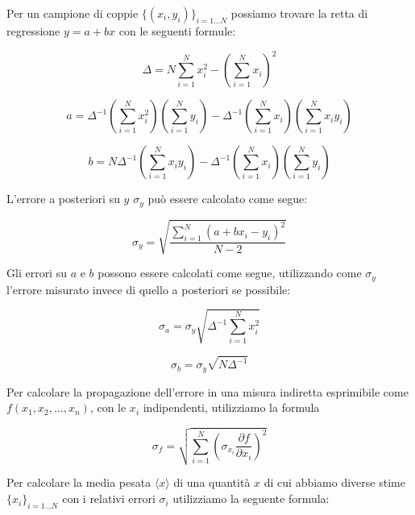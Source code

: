 \documentclass[12pt,a4paper]{article}
\begin{document}
Per un campione di coppie $\lbrace (x_i, y_i) \rbrace _{i = 1 \dots N}$ possiamo trovare la retta di regressione $y = a + b x$ con le seguenti formule:

\begin{equation}
\Delta = 
N \sum_{i=1}^N x_i^2
-
\left(
\sum_{i=1}^N x_i
\right) ^2
\end{equation}

\begin{equation}
a = \Delta ^{-1} \left(
\sum_{i=1}^N x_i^2
\right)
\left(
\sum_{i=1}^N y_i
\right)
- \Delta ^{-1}
\left(
\sum_{i=1}^N x_i
\right)
\left(
\sum_{i=1}^N x_i y_i
\right)
\end{equation}

\begin{equation}
b = N\Delta ^{-1}
\left(
\sum_{i=1}^N x_i y_i
\right)
- \Delta^{-1}
\left(
\sum_{i=1}^N x_i
\right)
\left(
\sum_{i=1}^N y_i
\right)
\end{equation}

L'errore a posteriori su $y$ $\sigma _y$ può essere calcolato come segue:

\begin{equation}
\sigma_y =
\sqrt{\frac{ \displaystyle
\sum_{i=1}^N \left( 
a + b x_i - y_i
\right)^2
}{N-2}}
\end{equation}

Gli errori su $a$ e $b$ possono essere calcolati come segue, utilizzando come $\sigma_y$ l'errore misurato invece di quello a posteriori se possibile:

\begin{equation}
\sigma_a = \sigma_y \sqrt{\Delta ^{-1} \displaystyle \sum_{i=1}^N x_i^2 }
\end{equation}

\begin{equation}
\sigma_b = \sigma_y \sqrt{N\Delta^{-1}}
\end{equation}

Per calcolare la propagazione dell'errore in una misura indiretta esprimibile come $f(x_1, x_2, \dots, x_n)$, con le $x_i$ indipendenti, utilizziamo la formula

\begin{equation}
\sigma_f = \sqrt{\sum_{i=1}^N \left( \sigma_{x_i} \frac{\partial f}{\partial x_i} \right)^2 }
\end{equation}

Per calcolare la media pesata $\langle x \rangle$ di una quantità $x$ di cui abbiamo diverse stime $\lbrace x_i \rbrace _{i=1 \dots N}$ con i relativi errori $\sigma_i$ utilizziamo la seguente formula:
\end{document}
